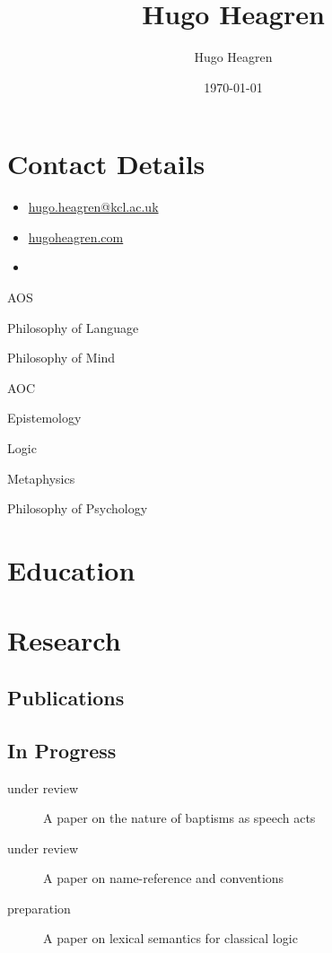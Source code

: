\documentclass{cv}
\author{Hugo Heagren}
\date{\today}
\title{Hugo Heagren}
\begin{document}
\maketitle
\nocite{*}

\section*{Contact Details}
\begin{itemize}
\item \href{mailto:hugo.heagren@kcl.ac.uk}{hugo.heagren@kcl.ac.uk}
\item \href{https://hugoheagren.com}{hugoheagren.com}
\item {}
\end{itemize}

\begin{areas}
\item[{AOS}]%
  \begin{area}
  \item Philosophy of Language
  \item Philosophy of Mind
  \end{area}
\item[{AOC}]%
  \begin{area}
  \item Epistemology
  \item Logic
  \item Metaphysics
  \item Philosophy of Psychology
\end{area}
\end{areas}

\section*{Education}
\printbibliography[check=Education]{}

\section*{Research}
\subsection*{Publications}
\printbibliography[check=Article]{}

\subsection*{In Progress}
\begin{description}
\item[under review] A paper on the nature of baptisms as speech acts
\item[under review] A paper on name-reference and conventions
\item[preparation] A paper on lexical semantics for classical logic
\end{description}
\end{document}
